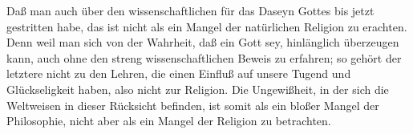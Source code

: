 \begin{aufza}
\begin{RWanm}
Daß man auch über den wissenschaftlichen  für das Daseyn Gottes bis jetzt gestritten habe, das ist nicht als ein Mangel der natürlichen Religion zu erachten. Denn weil man sich von der Wahrheit, daß ein Gott sey, hinlänglich überzeugen kann, auch ohne den streng wissenschaftlichen Beweis zu erfahren; so gehört der letztere nicht zu den Lehren, die einen Einfluß auf unsere Tugend und Glückseligkeit haben, also nicht zur Religion. Die Ungewißheit, in der sich die Weltweisen in dieser Rücksicht befinden, ist somit als ein bloßer Mangel der Philosophie, nicht aber als ein Mangel der Religion zu betrachten.~ 
\end{RWanm}
\end{aufza}
   
